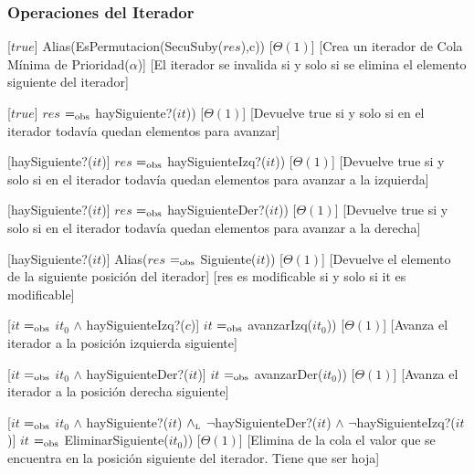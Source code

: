 \subsubsection{Operaciones del Iterador}

	[$true$]
	{Alias(EsPermutacion(SecuSuby($res$),c))}
	[$\Theta(1)$]
	[Crea un iterador de Cola Mínima de Prioridad($\alpha$)]
	[El iterador se invalida si y solo si se elimina el elemento siguiente del iterador]

	[$true$]
	{$res$ $=_{\mathrm{obs}}$ haySiguiente?($it$))}
	[$\Theta(1)$]
	[Devuelve true si y solo si en el iterador todavía quedan elementos para avanzar]

	[haySiguiente?($it$)]
	{$res$ $=_{\mathrm{obs}}$ haySiguienteIzq?($it$))}
	[$\Theta(1)$]
	[Devuelve true si y solo si en el iterador todavía quedan elementos para avanzar a la izquierda]

	[haySiguiente?($it$)]
	{$res$ $=_{\mathrm{obs}}$ haySiguienteDer?($it$))}
	[$\Theta(1)$]
	[Devuelve true si y solo si en el iterador todavía quedan elementos para avanzar a la derecha]	

	[haySiguiente?($it$)]
	{Alias($res$ $=_{\mathrm{obs}}$ Siguiente($it$))}
	[$\Theta(1)$]
	[Devuelve el elemento de la siguiente posición del iterador]
	[res es modificable si y solo si it es modificable]

	[$it$ $=_{\mathrm{obs}}$ $it_0$ $\wedge$ haySiguienteIzq?($c$)]
	{$it$ $=_{\mathrm{obs}}$ avanzarIzq($it_0$))}
	[$\Theta(1)$]
	[Avanza el iterador a la posición izquierda siguiente]

	[$it$ $=_{\mathrm{obs}}$ $it_0$ $\wedge$ haySiguienteDer?($it$)]
	{$it$ $=_{\mathrm{obs}}$ avanzarDer($it_0$))}
	[$\Theta(1)$]
	[Avanza el iterador a la posición derecha siguiente]

	[$it$ $=_{\mathrm{obs}}$ $it_0$ $\wedge$ haySiguiente?($it$) $\land_{\mathrm{\scriptscriptstyle{L}}}$ $\neg$haySiguienteDer?($it$) $\wedge$ $\neg$haySiguienteIzq?($it$)]
	{$it$ $=_{\mathrm{obs}}$ EliminarSiguiente($it_0$))}
	[$\Theta(1)$]
	[Elimina de la cola el valor que se encuentra en la posición siguiente del iterador. Tiene que ser hoja]
	
